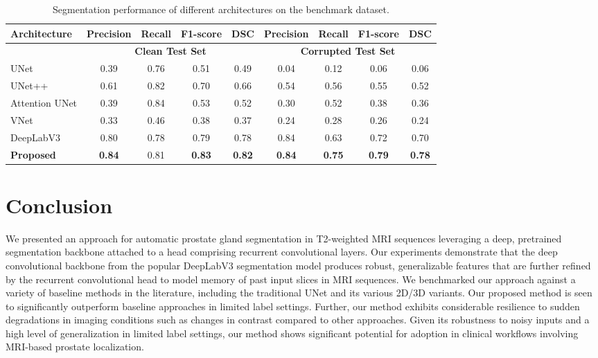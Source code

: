 \documentclass[journal]{IEEEtran}
\begin{document}
\begin{table}[h]
    \centering
    \renewcommand{\arraystretch}{1.3} %
    \begin{tabular}{lcccc|cccc}
        \toprule
        \textbf{Architecture} & \textbf{Precision} & \textbf{Recall} & \textbf{F1-score} & \textbf{DSC} & \textbf{Precision} & \textbf{Recall} & \textbf{F1-score} & \textbf{DSC} \\
        \midrule
        & \multicolumn{4}{c}{\textbf{Clean Test Set}} & \multicolumn{4}{c}{\textbf{Corrupted Test Set}}\\
        UNet \cite{ronneberger2015u} & 0.39 & 0.76 & 0.51 & 0.49 & 0.04 & 0.12 & 0.06 & 0.06 \\
        UNet++ \cite{zhou2018unet++} & 0.61 & 0.82 & 0.70 & 0.66 & 0.54 & 0.56 & 0.55 & 0.52\\
        Attention UNet \cite{oktay2018attention}& 0.39 & 0.84 & 0.53 & 0.52 & 0.30 & 0.52 & 0.38 & 0.36\\
        VNet \cite{milletari2016v} & 0.33 & 0.46 & 0.38 & 0.37 & 0.24 & 0.28 & 0.26 & 0.24 \\
        DeepLabV3 \cite{chen2017rethinking} & 0.80 & 0.78 & 0.79 & 0.78 & 0.84 & 0.63 & 0.72 & 0.70\\
        \textbf{Proposed} & \textbf{0.84} & 0.81 & \textbf{0.83} & \textbf{0.82} & \textbf{0.84} & \textbf{0.75} & \textbf{0.79} & \textbf{0.78}\\
        \bottomrule
    \end{tabular}
    \vspace{2mm}
    \caption{Segmentation performance of different architectures on the benchmark dataset.}
    \label{tab:prostate_seg_results}
\end{table}

\section{Conclusion}
We presented an approach for automatic prostate gland segmentation in T2-weighted MRI sequences leveraging a deep, pretrained segmentation backbone attached to a head comprising recurrent convolutional layers. Our experiments demonstrate that the deep convolutional backbone from the popular DeepLabV3 segmentation model produces robust, generalizable features that are further refined by the recurrent convolutional head to model memory of past input slices in MRI sequences. We benchmarked our approach against a variety of baseline methods in the literature, including the traditional UNet and its various 2D/3D variants. Our proposed method is seen to significantly outperform baseline approaches in limited label settings. Further, our method exhibits considerable resilience to sudden degradations in imaging conditions such as changes in contrast compared to other approaches. Given its robustness to noisy inputs and a high level of generalization in limited label settings, our method shows significant potential for adoption in clinical workflows involving MRI-based prostate localization.
\end{document}
